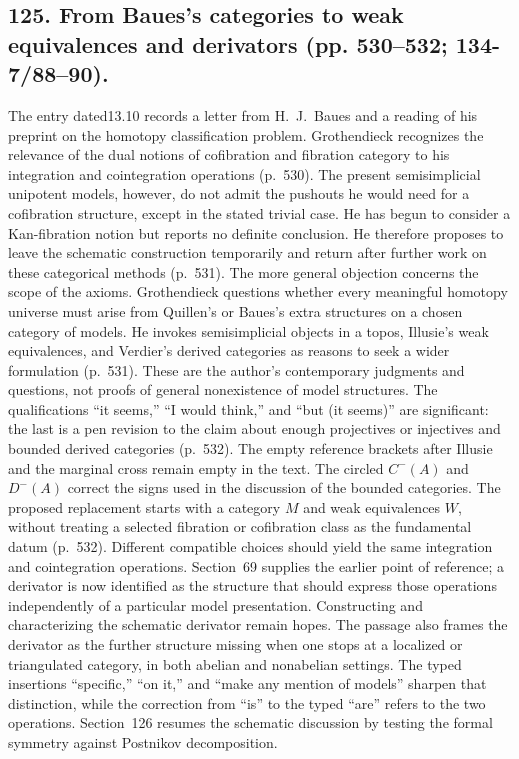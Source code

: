 \documentclass[10pt,oneside]{book}
\begin{document}
\subsection*{125. From Baues's categories to weak equivalences and derivators (pp. 530--532; 134-7/88--90).}
The entry dated13.10 records a letter from H.~J.~Baues and a reading of his preprint on the homotopy classification problem. Grothendieck recognizes the relevance of the dual notions of cofibration and fibration category to his integration and cointegration operations (p.~530). The present semisimplicial unipotent models, however, do not admit the pushouts he would need for a cofibration structure, except in the stated trivial case. He has begun to consider a Kan-fibration notion but reports no definite conclusion. He therefore proposes to leave the schematic construction temporarily and return after further work on these categorical methods (p.~531). The more general objection concerns the scope of the axioms. Grothendieck questions whether every meaningful homotopy universe must arise from Quillen's or Baues's extra structures on a chosen category of models. He invokes semisimplicial objects in a topos, Illusie's weak equivalences, and Verdier's derived categories as reasons to seek a wider formulation (p.~531). These are the author's contemporary judgments and questions, not proofs of general nonexistence of model structures. The qualifications ``it seems,'' ``I would think,'' and ``but (it seems)'' are significant: the last is a pen revision to the claim about enough projectives or injectives and bounded derived categories (p.~532). The empty reference brackets after Illusie and the marginal cross remain empty in the text. The circled $C^{-}(A)$ and $D^{-}(A)$ correct the signs used in the discussion of the bounded categories. The proposed replacement starts with a category $M$ and weak equivalences $W$, without treating a selected fibration or cofibration class as the fundamental datum (p.~532). Different compatible choices should yield the same integration and cointegration operations. Section~69 supplies the earlier point of reference; a derivator is now identified as the structure that should express those operations independently of a particular model presentation. Constructing and characterizing the schematic derivator remain hopes. The passage also frames the derivator as the further structure missing when one stops at a localized or triangulated category, in both abelian and nonabelian settings. The typed insertions ``specific,'' ``on it,'' and ``make any mention of models'' sharpen that distinction, while the correction from ``is'' to the typed ``are'' refers to the two operations. Section~126 resumes the schematic discussion by testing the formal symmetry against Postnikov decomposition.
\end{document}
